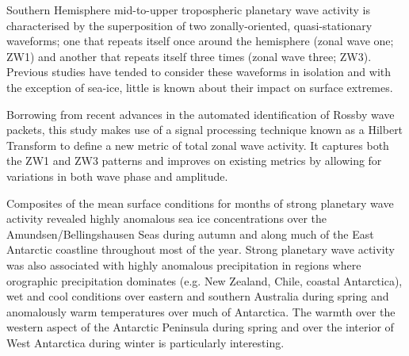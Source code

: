 Southern Hemisphere mid-to-upper tropospheric planetary wave activity is characterised by the superposition of two zonally-oriented, quasi-stationary waveforms; one that repeats itself once around the hemisphere (zonal wave one; ZW1) and another that repeats itself three times (zonal wave three; ZW3). Previous studies have tended to consider these waveforms in isolation and with the exception of sea-ice, little is known about their impact on surface extremes. 

Borrowing from recent advances in the automated identification of Rossby wave packets, this study makes use of a signal processing technique known as a Hilbert Transform to define a new metric of total zonal wave activity. It captures both the ZW1 and ZW3 patterns and improves on existing metrics by allowing for variations in both wave phase and amplitude.

Composites of the mean surface conditions for months of strong planetary wave activity revealed highly anomalous sea ice concentrations over the Amundsen/Bellingshausen Seas during autumn and along much of the East Antarctic coastline throughout most of the year. Strong planetary wave activity was also associated with highly anomalous precipitation in regions where orographic precipitation dominates (e.g. New Zealand, Chile, coastal Antarctica), wet and cool conditions over eastern and southern Australia during spring and anomalously warm temperatures over much of Antarctica. The warmth over the western aspect of the Antarctic Peninsula during spring and over the interior of West Antarctica during winter is particularly interesting.  

